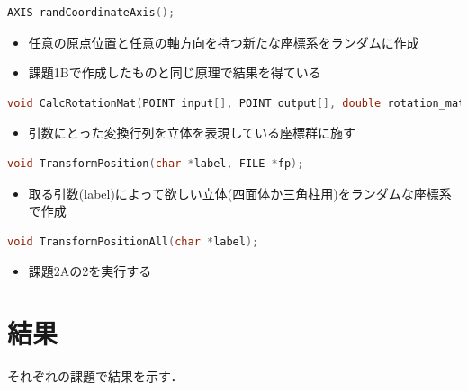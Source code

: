\documentclass[a4paper,10pt]{jsarticle}
\begin{document}
\begin{lstlisting}[basicstyle=\ttfamily\footnotesize, language=C, frame=single, numbers=none, breaklines=true]
AXIS randCoordinateAxis();
\end{lstlisting}

\begin{itemize}
 \item 任意の原点位置と任意の軸方向を持つ新たな座標系をランダムに作成
 \item 課題1Bで作成したものと同じ原理で結果を得ている
\end{itemize}

\begin{lstlisting}[basicstyle=\ttfamily\footnotesize, language=C, frame=single, numbers=none, breaklines=true]
void CalcRotationMat(POINT input[], POINT output[], double rotation_mat[][VEC_SIZE], int loop);
\end{lstlisting}

\begin{itemize}
 \item 引数にとった変換行列を立体を表現している座標群に施す
\end{itemize}

\begin{lstlisting}[basicstyle=\ttfamily\footnotesize, language=C, frame=single, numbers=none, breaklines=true]
void TransformPosition(char *label, FILE *fp);
\end{lstlisting}

\begin{itemize}
 \item 取る引数(label)によって欲しい立体(四面体か三角柱用)をランダムな座標系で作成
\end{itemize}

\begin{lstlisting}[basicstyle=\ttfamily\footnotesize, language=C, frame=single, numbers=none, breaklines=true]
void TransformPositionAll(char *label);
\end{lstlisting}

\begin{itemize}
 \item 課題2Aの2を実行する
\end{itemize}

\section{結果}
それぞれの課題で結果を示す．
\end{document}
